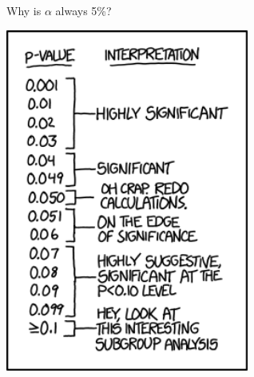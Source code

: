 \begin{frame}{Why is $\alpha$ always 5\%?}

    \begin{center}
        \includegraphics[width=0.6\textwidth]{p_values}
    \end{center}

\end{frame}



